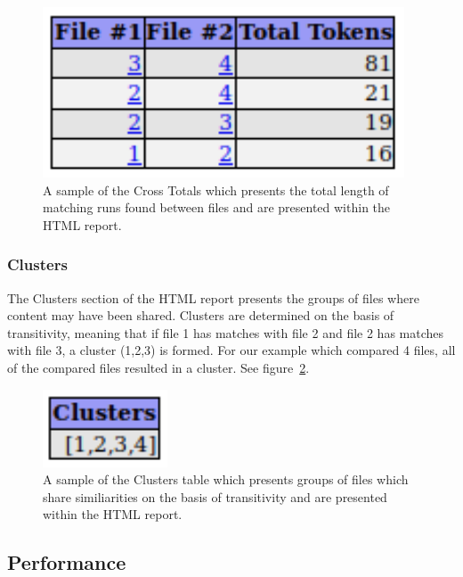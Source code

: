 \documentclass[11pt, a4paper]{article}
\begin{document}
\begin{figure}
\begin{center}
\includegraphics[scale=0.86]{ReportCrossTotals}
\end{center}
\caption{\label{fig:reportCrossTotals}A sample of the Cross Totals   which presents the total length of matching runs found between files and are presented within the HTML report.}
\end{figure}

\subsubsection{Clusters}

The Clusters section of the HTML report presents the groups of files where content may have been shared. Clusters are determined on the basis of transitivity, meaning that if file 1 has matches with file 2 and file 2 has matches with file 3, a cluster (1,2,3) is formed. For our example which compared 4 files, all of the compared files resulted in a cluster. See figure~\ref{fig:reportClusters}.

\begin{figure}
\begin{center}
\includegraphics[scale=0.86]{ReportClusters}
\end{center}
\caption{\label{fig:reportClusters}A sample of the Clusters table which presents groups of files which share similiarities on the basis of transitivity and are presented within the HTML report.}
\end{figure}

\subsection{Performance}
\end{document}
